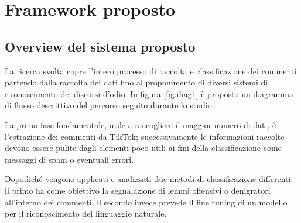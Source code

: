 
\chapter{Framework proposto}
\label{sec:FrameworkProposto}
\hspace{0,5cm}




\section{Overview del sistema proposto}

La ricerca svolta copre l'intero processo di raccolta e classificazione dei commenti partendo dalla raccolta dei dati fino al proponimento di diversi sistemi di riconoscimento dei discorsi d'odio. In figura \ref{fig:diag1} è proposto un diagramma di flusso descrittivo del percorso seguito durante lo studio. 

La prima fase fondamentale, utile a raccogliere il maggior numero di dati, è l'estrazione dei commenti da TikTok; successivamente le informazioni raccolte devono essere pulite dagli elementi poco utili ai fini della classificazione come messaggi di spam o eventuali errori.

Dopodiché vengono applicati e analizzati due metodi di classificazione differenti: il primo ha come obiettivo la segnalazione di lemmi offensivi o denigratori all'interno dei commenti, il secondo invece prevede il fine tuning di un modello per il riconoscimento del linguaggio naturale.


